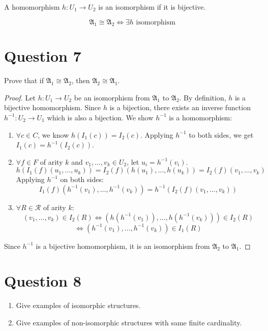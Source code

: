 \documentclass{article}
\newtheorem{definition}[theorem]{Definition}
\let\olddefinition\definition
\let\endolddefinition\enddefinition
\renewenvironment{definition}
  {\begin{tcolorbox}[
      colback=red!10,
      colframe=red!50!black,
      boxrule=0.6pt,
      arc=2pt,
      left=6pt,right=6pt,top=4pt,bottom=4pt,
      breakable
    ]\olddefinition}
  {\endolddefinition\end{tcolorbox}}
\begin{document}
\begin{definition}
    A homomorphism $h : U_1 \to U_2$ is an isomorphism if it is bijective.

\[
\mathfrak{A}_1 \cong \mathfrak{A}_2 \iff \exists h \text{ isomorphism}
\]
\end{definition}

\section*{Question 7}
Prove that if $\mathfrak{A}_1 \cong \mathfrak{A}_2$, then $\mathfrak{A}_2 \cong \mathfrak{A}_1$.
\begin{proof}
    Let $h: U_1 \to U_2$ be an isomorphism from $\mathfrak{A}_1$ to $\mathfrak{A}_2$. By definition, $h$ is a bijective homomorphism. Since $h$ is a bijection, there exists an inverse function $h^{-1}: U_2 \to U_1$ which is also a bijection. We show $h^{-1}$ is a homomorphism:
    
    \begin{enumerate}
        \item $\forall c \in {C}$, we know $h(I_1(c)) = I_2(c)$. Applying $h^{-1}$ to both sides, we get $I_1(c) = h^{-1}(I_2(c))$.
        
        \item $\forall f \in {F}$ of arity $k$ and $v_1, \dots, v_k \in U_2$, let $u_i = h^{-1}(v_i)$. 
        \[ h(I_1(f)(u_1, \dots, u_k)) = I_2(f)(h(u_1), \dots, h(u_k)) = I_2(f)(v_1, \dots, v_k) \]
        Applying $h^{-1}$ on both sides:
        \[ I_1(f)(h^{-1}(v_1), \dots, h^{-1}(v_k)) = h^{-1}(I_2(f)(v_1, \dots, v_k)) \]
        
        \item $\forall R \in \mathcal{R}$ of arity $k$:
        \[ (v_1, \dots, v_k) \in I_2(R) \iff (h(h^{-1}(v_1)), \dots, h(h^{-1}(v_k))) \in I_2(R) \]
        \[ \iff (h^{-1}(v_1), \dots, h^{-1}(v_k)) \in I_1(R) \]
    \end{enumerate}
    Since $h^{-1}$ is a bijective homomorphism, it is an isomorphism from $\mathfrak{A}_2$ to $\mathfrak{A}_1$.
    \end{proof}

\section*{Question 8}
\begin{enumerate}
    \item Give examples of isomorphic structures.
    \item Give examples of non-isomorphic structures with same finite cardinality.
\end{enumerate}
\end{document}
